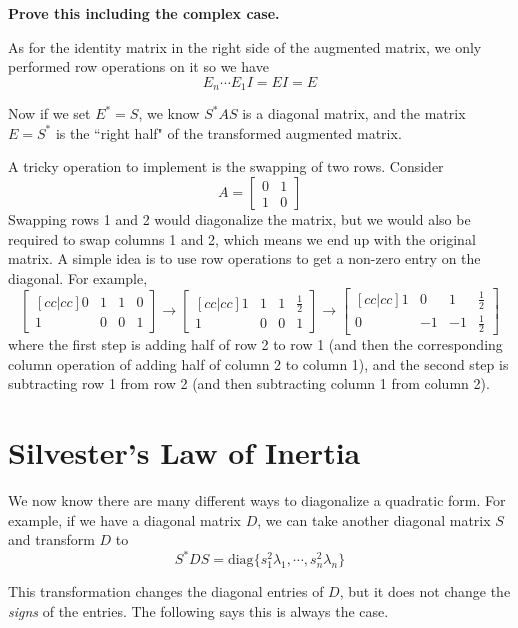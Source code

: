 \documentclass[a4paper,10pt]{book}
\theoremstyle{plain}
\theoremstyle{plain}
\theoremstyle{definition}
\begin{document}
\textbf{Prove this including the complex case. }

As for the identity matrix in the right side of the augmented matrix, we only performed row operations on it so we have 
$$E_{n} \cdots E_{1} I = EI = E$$

Now if we set $E^{*} = S$, we know $S^{*}AS$ is a diagonal matrix, and the matrix $E = S^{*}$ is the ``right half" of the transformed augmented matrix. 

A tricky operation to implement is the swapping of two rows. Consider 
$$A = \begin{bmatrix}
0 & 1 \\
1 & 0
\end{bmatrix}$$
Swapping rows 1 and 2 would diagonalize the matrix, but we would also be required to swap columns 1 and 2, which means we end up with the original matrix. A simple idea is to use row operations to get a non-zero entry on the diagonal. For example, 
$$\begin{bmatrix}[cc|cc]
0 & 1 & 1 & 0 \\
1 & 0 & 0 & 1
\end{bmatrix} \rightarrow \begin{bmatrix}[cc|cc] 
1 & 1 & 1 & \frac{1}{2} \\
1 & 0 & 0 & 1
\end{bmatrix} \rightarrow \begin{bmatrix}[cc|cc] 
1 & 0 & 1 & \frac{1}{2} \\
0 & -1 & -1 & \frac{1}{2}
\end{bmatrix}
$$
where the first step is adding half of row 2 to row 1 (and then the corresponding column operation of adding half of column 2 to column 1), and the second step is subtracting row 1 from row 2 (and then subtracting column 1 from column 2). 

\section{Silvester's Law of Inertia} 

We now know there are many different ways to diagonalize a quadratic form. For example, if we have a diagonal matrix $D$, we can take another diagonal matrix $S$ and transform $D$ to 
$$S^{*} DS = \text{diag}\{ s_{1}^{2} \lambda_{1}, \cdots, s_{n}^{2} \lambda_{n} \}$$

This transformation changes the diagonal entries of $D$, but it does not change the \textit{signs} of the entries. The following says this is always the case. 
\end{document}
